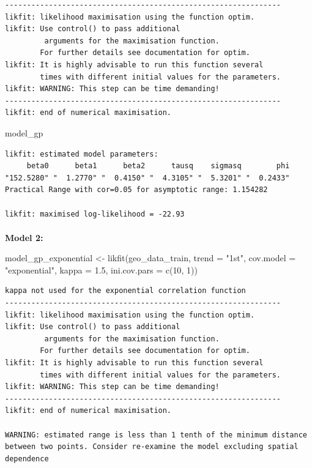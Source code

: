 \documentclass[
  11pt,
]{article}
\makeatletter
\let\oldparagraph\paragraph
\renewcommand{\paragraph}{
    \@ifstar
      \xxxParagraphStar
      \xxxParagraphNoStar
  }
\newcommand{\xxxParagraphStar}[1]{\oldparagraph*{#1}\mbox{}}
\newcommand{\xxxParagraphNoStar}[1]{\oldparagraph{#1}\mbox{}}
\newenvironment{Shaded}{\begin{snugshade}}{\end{snugshade}}
\newcommand{\AttributeTok}[1]{\textcolor[rgb]{0.40,0.45,0.13}{#1}}
\newcommand{\DecValTok}[1]{\textcolor[rgb]{0.68,0.00,0.00}{#1}}
\newcommand{\FloatTok}[1]{\textcolor[rgb]{0.68,0.00,0.00}{#1}}
\newcommand{\FunctionTok}[1]{\textcolor[rgb]{0.28,0.35,0.67}{#1}}
\newcommand{\NormalTok}[1]{\textcolor[rgb]{0.00,0.23,0.31}{#1}}
\newcommand{\OtherTok}[1]{\textcolor[rgb]{0.00,0.23,0.31}{#1}}
\newcommand{\StringTok}[1]{\textcolor[rgb]{0.13,0.47,0.30}{#1}}
\makeatother
\begin{document}
\begin{verbatim}
---------------------------------------------------------------
likfit: likelihood maximisation using the function optim.
likfit: Use control() to pass additional
         arguments for the maximisation function.
        For further details see documentation for optim.
likfit: It is highly advisable to run this function several
        times with different initial values for the parameters.
likfit: WARNING: This step can be time demanding!
---------------------------------------------------------------
likfit: end of numerical maximisation.
\end{verbatim}

\begin{Shaded}
\begin{Highlighting}[]
\NormalTok{model\_gp}
\end{Highlighting}
\end{Shaded}

\begin{verbatim}
likfit: estimated model parameters:
     beta0      beta1      beta2      tausq    sigmasq        phi 
"152.5280" "  1.2770" "  0.4150" "  4.3105" "  5.3201" "  0.2433" 
Practical Range with cor=0.05 for asymptotic range: 1.154282

likfit: maximised log-likelihood = -22.93
\end{verbatim}

\paragraph{\texorpdfstring{\textbf{Model 2:}}{Model 2:}}\label{model-2}

\begin{Shaded}
\begin{Highlighting}[]
\NormalTok{model\_gp\_exponential }\OtherTok{\textless{}{-}} \FunctionTok{likfit}\NormalTok{(geo\_data\_train, }\AttributeTok{trend =} \StringTok{"1st"}\NormalTok{, }\AttributeTok{cov.model =} \StringTok{"exponential"}\NormalTok{, }\AttributeTok{kappa =} \FloatTok{1.5}\NormalTok{, }\AttributeTok{ini.cov.pars =} \FunctionTok{c}\NormalTok{(}\DecValTok{10}\NormalTok{, }\DecValTok{1}\NormalTok{))}
\end{Highlighting}
\end{Shaded}

\begin{verbatim}
kappa not used for the exponential correlation function
---------------------------------------------------------------
likfit: likelihood maximisation using the function optim.
likfit: Use control() to pass additional
         arguments for the maximisation function.
        For further details see documentation for optim.
likfit: It is highly advisable to run this function several
        times with different initial values for the parameters.
likfit: WARNING: This step can be time demanding!
---------------------------------------------------------------
likfit: end of numerical maximisation.

WARNING: estimated range is less than 1 tenth of the minimum distance between two points. Consider re-examine the model excluding spatial dependence
\end{verbatim}
\end{document}
